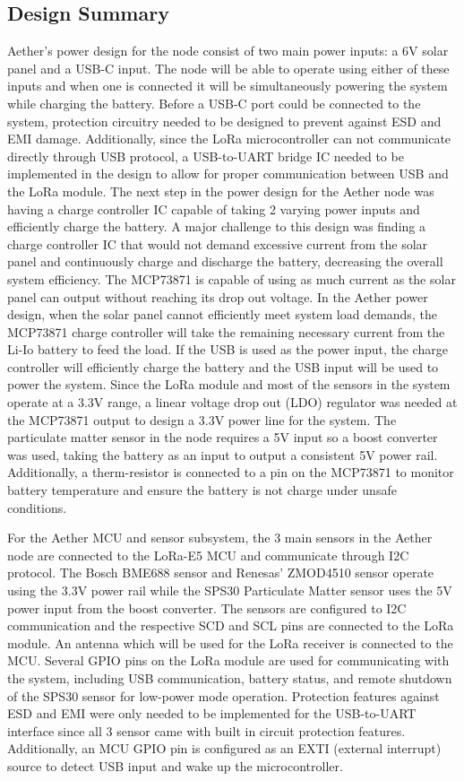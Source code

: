 \subsection{Design Summary}
Aether's power design for the node consist of two main power inputs: a 6V solar panel and a USB-C input. The node will be able to operate using either of these inputs and when one is connected it will be simultaneously powering the system while charging the battery. Before a USB-C port could be connected to the system, protection circuitry needed to be designed to prevent against ESD and EMI damage. Additionally, since the LoRa microcontroller can not communicate directly through USB protocol, a USB-to-UART bridge IC needed to be implemented in the design to allow for proper communication between USB and the LoRa module. The next step in the power design for the Aether node was having a charge controller IC capable of taking 2 varying power inputs and efficiently charge the battery. A major challenge to this design was finding a charge controller IC that would not demand excessive current from the solar panel and continuously charge and discharge the battery, decreasing the overall system efficiency. The MCP73871 is capable of using as much current as the solar panel can output without reaching its drop out voltage. In the Aether power design, when the solar panel cannot efficiently meet system load demands, the MCP73871 charge controller will take the remaining necessary current from the Li-Io battery to feed the load. If the USB is used as the power input, the charge controller will efficiently charge the battery and the USB input will be used to power the system. Since the LoRa module and most of the sensors in the system operate at a 3.3V range, a linear voltage drop out (LDO) regulator was needed at the MCP73871 output to design a 3.3V power line for the system. The particulate matter sensor in the node requires a 5V input so a boost converter was used, taking the battery as an input to output a consistent 5V power rail. Additionally, a therm-resistor is connected to a pin on the MCP73871 to monitor battery temperature and ensure the battery is not charge under unsafe conditions. 

For the Aether MCU and sensor subsystem, the 3 main sensors in the Aether node are connected to the LoRa-E5 MCU and communicate through I2C protocol. The Bosch BME688 sensor and Renesas' ZMOD4510 sensor operate using the 3.3V power rail while the SPS30 Particulate Matter sensor uses the 5V power input from the boost converter. The sensors are configured to I2C communication and the respective SCD and SCL pins are connected to the LoRa module. An antenna which will be used for the LoRa receiver is connected to the MCU. Several GPIO pins on the LoRa module are used for communicating with the system, including USB communication, battery status, and remote shutdown of the SPS30 sensor for low-power mode operation. Protection features against ESD and EMI were only needed to be implemented for the USB-to-UART interface since all 3 sensor came with built in circuit protection features. Additionally, an MCU GPIO pin is configured as an EXTI (external interrupt) source to detect USB input and wake up the microcontroller.
 
